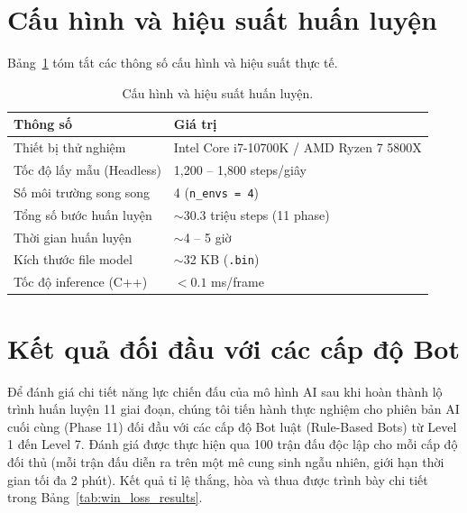 \documentclass[a4paper, 12pt]{report}
\begin{document}
  \section{Cấu hình và hiệu suất huấn luyện}

  Bảng~\ref{tab:perf} tóm tắt các thông số cấu hình và hiệu suất thực tế.

  \begin{table}[H]
  \centering
  \caption{Cấu hình và hiệu suất huấn luyện.}
  \label{tab:perf}
  \renewcommand{\arraystretch}{1.3}
  \begin{tabular}{l l}
    \toprule
    \textbf{Thông số} & \textbf{Giá trị} \\
    \midrule
    Thiết bị thử nghiệm      & Intel Core i7-10700K / AMD Ryzen 7 5800X \\
    Tốc độ lấy mẫu (Headless) & 1,200 -- 1,800 steps/giây \\
    Số môi trường song song   & 4 (\texttt{n\_envs = 4}) \\
    Tổng số bước huấn luyện   & $\sim$30.3 triệu steps (11 phase) \\
    Thời gian huấn luyện      & $\sim$4 -- 5 giờ \\
    Kích thước file model      & $\sim$32 KB (\texttt{.bin}) \\
    Tốc độ inference (C++)     & $< 0.1$ ms/frame \\
    \bottomrule
  \end{tabular}
  \end{table}

  \section{Kết quả đối đầu với các cấp độ Bot}

  Để đánh giá chi tiết năng lực chiến đấu của mô hình AI sau khi hoàn thành lộ trình huấn luyện 11 giai đoạn, chúng tôi tiến hành thực nghiệm cho phiên bản AI cuối cùng (Phase 11) đối đầu với các cấp độ Bot luật (Rule-Based Bots) từ Level 1 đến Level 7. Đánh giá được thực hiện qua 100 trận đấu độc lập cho mỗi cấp độ đối thủ (mỗi trận đấu diễn ra trên một mê cung sinh ngẫu nhiên, giới hạn thời gian tối đa 2 phút). Kết quả tỉ lệ thắng, hòa và thua được trình bày chi tiết trong Bảng~\ref{tab:win_loss_results}.
\end{document}
